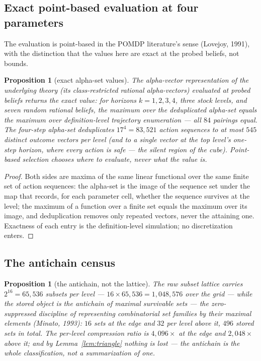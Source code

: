 \documentclass[10pt,twocolumn]{article}
\theoremstyle{plain}
\newtheorem{proposition}[theorem]{Proposition}
\theoremstyle{definition}
\theoremstyle{remark}
\begin{document}
\subsection{Exact point-based evaluation at four parameters}
\label{pbvi}

The evaluation is point-based in the POMDP literature's sense
(Lovejoy, 1991), with the distinction that the values here are exact at
the probed beliefs, not bounds.

\begin{proposition}[exact alpha-set values]\label{prop:pbvi}
The alpha-vector representation of the underlying theory (its
class-restricted rational alpha-vectors) evaluated at probed beliefs
returns the exact value: for horizons \(k = 1, 2, 3, 4\), three stock
levels, and seven random rational beliefs, the maximum over the
deduplicated alpha-set equals the maximum over definition-level
trajectory enumeration --- all \(84\) pairings equal. The four-step
alpha-set deduplicates \(17^{4} = 83{,}521\) action sequences to at
most \(545\) distinct outcome vectors per level (and to a single
vector at the top level's one-step horizon, where every action is
safe --- the silent region of the cube). Point-based selection
chooses where to evaluate, never what the value is.
\end{proposition}

\begin{proof}
Both sides are maxima of the same linear functional over the same
finite set of action sequences: the alpha-set is the image of the
sequence set under the map that records, for each parameter cell,
whether the sequence survives at the level; the maximum of a function
over a finite set equals the maximum over its image, and
deduplication removes only repeated vectors, never the attaining one.
Exactness of each entry is the definition-level simulation; no
discretization enters.
\end{proof}

\subsection{The antichain census}\label{census}

\begin{proposition}[the antichain, not the lattice]\label{prop:census}
The raw subset lattice carries \(2^{16} = 65{,}536\) subsets per
level --- \(16 \times 65{,}536 = 1{,}048{,}576\) over the grid ---
while the stored object is the antichain of maximal survivable sets --- the zero-suppressed
discipline of representing combinatorial set families by their maximal
elements (Minato, 1993):
\(16\) sets at the edge and \(32\) per level above it, \(496\) stored
sets in total. The per-level compression ratio is \(4{,}096\times\) at
the edge and \(2{,}048\times\) above it; and by
Lemma~\ref{lem:triangle} nothing is lost --- the antichain is the
whole classification, not a summarization of one.
\end{proposition}
\end{document}
